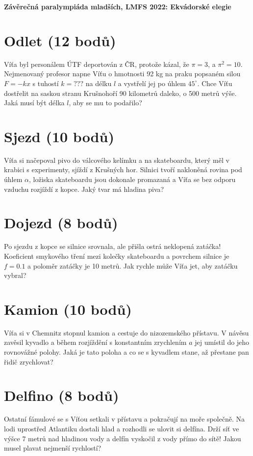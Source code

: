 \documentclass[10pt,a4paper,landscape]{article}
\author{Ondřej Zelenka}
\begin{document}
\pagestyle{empty}
\textbf{\center\LARGE Závěrečná paralympiáda mladších, LMFS 2022: Ekvádorské elegie}

\begin{multicols}{2}[]

\section{Odlet (12 bodů)}
Víťa byl personálem ÚTF deportován z ČR, protože kázal, že $\pi=3$, a $\pi^2=10$. Nejmenovaný profesor napne Víťu o hmotnosti 92 kg na praku popsaném silou $F = -kx$ s tuhostí $k = ???$ na délku $l$ a vystřelí jej po úhlem $45^\circ$. Chce Víťu dostřelit na saskou stranu Krušnohoří 90 kilometrů daleko, o 500 metrů výše. Jaká musí být délka $l$, aby se mu to podařilo?

\section{Sjezd (10 bodů)}
Víťa si načepoval pivo do válcového kelímku a na skateboardu, který měl v krabici s experimenty, sjíždí z Krušných hor. Silnici tvoří nakloněná rovina pod úhlem $\alpha$, ložiska skateboardu jsou dokonale promazaná a Víťa se bez odporu vzduchu rozjíždí z kopce. Jaký tvar má hladina piva?

\section{Dojezd (8 bodů)}
Po sjezdu z kopce se silnice srovnala, ale přišla ostrá neklopená zatáčka! Koeficient smykového tření mezi kolečky skateboardu a povrchem silnice je $f=0.1$ a poloměr zatáčky je 10 metrů. Jak rychle může Víťa jet, aby zatáčku vybral?

\section{Kamion (10 bodů)}
Víťa si v Chemnitz stopnul kamion a cestuje do nizozemského přístavu. V návěsu zavěsil kyvadlo a během rozjíždění s konstantním zrychlením $a$ jej umístil do jeho rovnovážné polohy. Jaká je tato poloha a co se s kyvadlem stane, až přestane pan řidič zrychlovat?

\section{Delfino (8 bodů)}
Ostatní fámulové se s Víťou setkali v přístavu a pokračují na moře společně. Na lodi uprostřed Atlantiku dostali hlad a rozhodli se ulovit si delfína. Drží síť ve výšce 7 metrů nad hladinou vody a delfín vyskočil z vody přímo do sítě! Jakou musel plavat nejmenší rychlostí?


\end{multicols}
\end{document}
